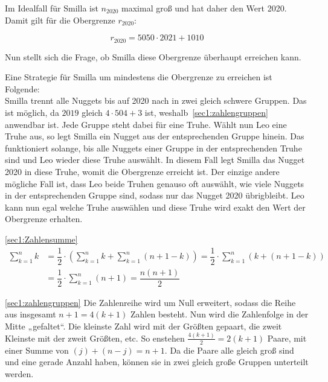 \documentclass[10pt, a4paper]{amsart}
\makeatletter
\renewenvironment{proof}[1][\proofname]{\par
\pushQED{\qed}%
\normalfont \topsep6\p@\@plus6\p@\relax
\trivlist
\item\relax
{\bfseries#1}\hspace\labelsep\ignorespaces
}{%
\popQED\endtrivlist\@endpefalse
}
\newenvironment{proof thm}[1]{
\begin{proof}[\proofname~(#1)]}{\end{proof}}
\makeatother
\begin{document}
\begin{proof}
  Im Idealfall für Smilla ist $n_{2020}$ maximal groß und hat daher den Wert
  2020. Damit gilt für die Obergrenze $r_{2020}$:

  \begin{equation*}
    r_{2020}=5050\cdot2021+1010
  \end{equation*}

  Nun stellt sich die Frage, ob Smilla diese Obergrenze überhaupt erreichen
  kann.

  Eine Strategie für Smilla um mindestens die Obergrenze zu erreichen ist Folgende:\\
  Smilla trennt alle Nuggets bis auf 2020 nach in zwei gleich schwere Gruppen.
  Das ist möglich, da $2019$ gleich $4\cdot504 + 3$ ist,
  weshalb~\autoref{sec1:zahlengruppen} anwendbar ist. Jede Gruppe steht dabei
  für eine Truhe. Wählt nun Leo eine Truhe aus, so legt Smilla ein Nugget aus
  der entsprechenden Gruppe hinein. Das funktioniert solange, bis alle Nuggets
  einer Gruppe in der entsprechenden Truhe sind und Leo wieder diese Truhe
  auswählt. In diesem Fall legt Smilla das Nugget 2020 in diese Truhe, womit die
  Obergrenze erreicht ist. Der einzige andere mögliche Fall ist, dass Leo beide
  Truhen genauso oft auswählt, wie viele Nuggets in der entsprechenden Gruppe
  sind, sodass nur das Nugget 2020 übrigbleibt. Leo kann nun egal welche Truhe
  auswählen und diese Truhe wird exakt den Wert der Obergrenze erhalten.
\end{proof}
\begin{proof thm}{\autoref{sec1:Zahlensumme}}
  \begin{align*}
    \sum^{n}_{k=1}k&=\dfrac{1}{2}\cdot\left( \sum^{n}_{k=1}k +
                     \sum^{n}_{k=1}(n+1-k)\right) = \dfrac{1}{2}\cdot\sum^{n}_{k=1}(k+(n+1-k))\\
                   &=\dfrac{1}{2}\cdot\sum^{n}_{k=1}(n+1) = \dfrac{n(n+1)}{2}
  \end{align*}
\end{proof thm}
\begin{proof thm}{\autoref{sec1:zahlengruppen}}
  Die Zahlenreihe wird um Null erweitert, sodass die Reihe aus insgesamt
  $n+1=4(k+1)$ Zahlen besteht. Nun wird die Zahlenfolge in der Mitte „gefaltet“.
  Die kleinste Zahl wird mit der Größten gepaart, die zweit Kleinste mit der
  zweit Größten, etc. So enstehen $\frac{4(k+1)}{2}=2(k+1)$ Paare, mit einer
  Summe von $(j)+(n-j) = n+1$. Da die Paare alle gleich groß sind und eine
  gerade Anzahl haben, können sie in zwei gleich große Gruppen unterteilt
  werden.
\end{proof thm}
\end{document}
